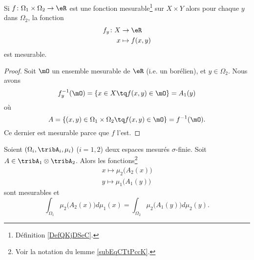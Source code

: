 \begin{corollary}
    Si \( f\colon \Omega_1\times \Omega_2\to \eR\) est une fonction mesurable\footnote{Définition \ref{DefQKjDSeC}.} sur \( X\times Y\) alors pour chaque \( y\) dans \( \Omega_2\), la fonction
    \begin{equation}
        \begin{aligned}
            f_y\colon X&\to \eR \\
            x&\mapsto f(x,y) 
        \end{aligned}
    \end{equation}
    est mesurable.
\end{corollary}

\begin{proof}
    Soit \( \mO\) un ensemble mesurable de \( \eR\) (i.e. un borélien), et \( y\in \Omega_2\). Nous avons
    \begin{equation}
        f_y^{-1}(\mO)=\{ x\in X\tq f(x,y)\in \mO \}=A_1(y)
    \end{equation}
    où
    \begin{equation}
        A=\{ (x,y)\in \Omega_1\times \Omega_2\tq f(x,y)\in \mO \}=f^{-1}(\mO).
    \end{equation}
    Ce dernier est mesurable parce que \( f\) l'est.
\end{proof}

\begin{theorem}    \label{ThoCCIsLhO}
    Soient \( (\Omega_i,\tribA_i,\mu_i)\) (\( i=1,2\)) deux espaces mesurés \( \sigma\)-finie. Soit \( A\in\tribA_1\otimes \tribA_2\). Alors les fonctions\footnote{Voir la notation du lemme \ref{subEqCTtPccK}.}
    \begin{subequations}
        \begin{align}
            x\mapsto\mu_2\big( A_2(x) \big)\\
            y\mapsto\mu_1\big( A_1(y) \big)
        \end{align}
    \end{subequations}
    sont mesurables et
    \begin{equation}    \label{EqRKXwsQJ}
        \int_{\Omega_1}\mu_2\big( A_2(x) \big)d\mu_1(x)=\int_{\Omega_2}\mu_2\big( A_1(y) \big)d\mu_2(y).
    \end{equation}
\end{theorem}

